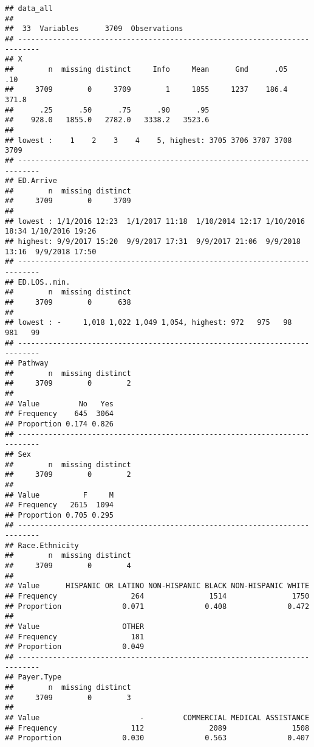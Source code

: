 \documentclass[]{article}
\begin{document}
\begin{verbatim}
## data_all 
## 
##  33  Variables      3709  Observations
## ---------------------------------------------------------------------------
## X 
##        n  missing distinct     Info     Mean      Gmd      .05      .10 
##     3709        0     3709        1     1855     1237    186.4    371.8 
##      .25      .50      .75      .90      .95 
##    928.0   1855.0   2782.0   3338.2   3523.6 
## 
## lowest :    1    2    3    4    5, highest: 3705 3706 3707 3708 3709
## ---------------------------------------------------------------------------
## ED.Arrive 
##        n  missing distinct 
##     3709        0     3709 
## 
## lowest : 1/1/2016 12:23  1/1/2017 11:18  1/10/2014 12:17 1/10/2016 18:34 1/10/2016 19:26
## highest: 9/9/2017 15:20  9/9/2017 17:31  9/9/2017 21:06  9/9/2018 13:16  9/9/2018 17:50 
## ---------------------------------------------------------------------------
## ED.LOS..min. 
##        n  missing distinct 
##     3709        0      638 
## 
## lowest : -     1,018 1,022 1,049 1,054, highest: 972   975   98    981   99   
## ---------------------------------------------------------------------------
## Pathway 
##        n  missing distinct 
##     3709        0        2 
##                       
## Value         No   Yes
## Frequency    645  3064
## Proportion 0.174 0.826
## ---------------------------------------------------------------------------
## Sex 
##        n  missing distinct 
##     3709        0        2 
##                       
## Value          F     M
## Frequency   2615  1094
## Proportion 0.705 0.295
## ---------------------------------------------------------------------------
## Race.Ethnicity 
##        n  missing distinct 
##     3709        0        4 
##                                                                    
## Value      HISPANIC OR LATINO NON-HISPANIC BLACK NON-HISPANIC WHITE
## Frequency                 264               1514               1750
## Proportion              0.071              0.408              0.472
##                              
## Value                   OTHER
## Frequency                 181
## Proportion              0.049
## ---------------------------------------------------------------------------
## Payer.Type 
##        n  missing distinct 
##     3709        0        3 
##                                                                    
## Value                       -         COMMERCIAL MEDICAL ASSISTANCE
## Frequency                 112               2089               1508
## Proportion              0.030              0.563              0.407

\end{verbatim}
\end{document}
